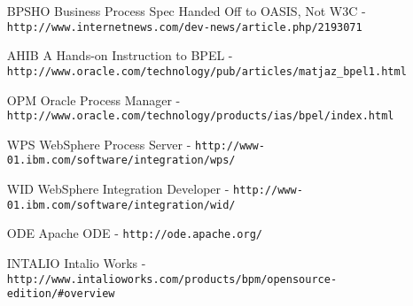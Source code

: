 \documentclass[11pt,a4paper]{article}
\begin{document}
\begin{itemize}
\item[BPSHO] Business Process Spec Handed Off to OASIS, Not W3C - \verb!http://www.internetnews.com/dev-news/article.php/2193071!

\item[AHIB] A Hands-on Instruction to BPEL - \verb!http://www.oracle.com/technology/pub/articles/matjaz_bpel1.html!

\item[OPM] Oracle Process Manager - \verb!http://www.oracle.com/technology/products/ias/bpel/index.html!

\item[WPS] WebSphere Process Server - \verb!http://www-01.ibm.com/software/integration/wps/!

\item[WID] WebSphere Integration Developer - \verb!http://www-01.ibm.com/software/integration/wid/!

\item[ODE] Apache ODE - \verb!http://ode.apache.org/!

\item[INTALIO] Intalio Works - \verb!http://www.intalioworks.com/products/bpm/opensource-edition/#overview!
\end{itemize}
\end{document}
